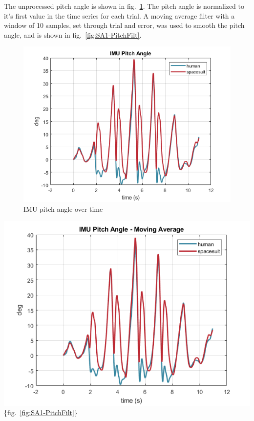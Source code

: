 \documentclass[defaultstyle,11pt]{comps}
\begin{document}
The unprocessed pitch angle is shown in fig.~\ref{fig:SA1-PitchRaw}.
The pitch angle is normalized to it's first value in the time series for each trial.
A moving average filter with a window of 10 samples, set through trial and error, was used to smooth the pitch angle, and is shown in fig.~\ref{fig:SA1-PitchFilt}.

\begin{figure}
\hypertarget{fig:SA1-PitchRaw}{%
\centering
\includegraphics{../fig/SA1/S3C0T1R_Pitch.png}
\caption{IMU pitch angle over time}\label{fig:SA1-PitchRaw}
}
\end{figure}

\includegraphics{../fig/SA1/S3C0T1R_Pitch_Smooth.png}\{fig.~\ref{fig:SA1-PitchFilt}\}
\end{document}
